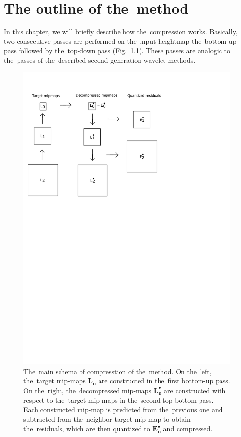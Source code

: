 \chapter{The outline of the~method}\label{chap:outline}

\newcommand{\objnorm}[2]{\mathbold{#1_{#2}}}
\newcommand{\objdot}[2]{\mathbold{#1_{#2}^\bullet}}
\newcommand{\lnorm}[1]{\objnorm{L}{#1}}
\newcommand{\ldot}[1]{\mathbold{L_{#1}^\bullet}}

\newcommand{\opnorm}[2]{\mathit{#1_{#2}}}
\newcommand{\dnorm}{\opnorm{Q}{D}}

In this chapter, we will briefly describe how the~compression works. Basically, two consecutive passes are performed on the~input heightmap the~bottom-up pass followed by the~top-down pass (Fig.~\ref{fig:main_schema}). These passes are analogic to the~passes of the~described second-generation wavelet methods. 
	
	\begin{figure}
		\includegraphics[trim={0 15cm 6cm 1cm}, clip, width=1\textwidth]{figures/main_schema.pdf}\centering
		\caption{The~main schema of compresstion of the~method. On the~left, the~target mip-maps $\lnorm{n}$ are constructed in the~first bottom-up pass. On the~right, the~decompressed mip-maps $\ldot{n}$ are constructed with respect to the~target mip-maps in the~second top-bottom pass. Each constructed mip-map is predicted from the~previous one and subtracted from the~neighbor target mip-map to obtain the~residuals, which are then quantized to $\objdot{E}{n}$ and compressed.}
		\label{fig:main_schema}
	\end{figure}


